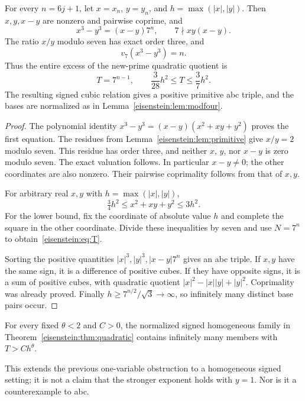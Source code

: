 \begin{theorem}\label{eisenstein:thm:quadratic}
For every $n=6j+1$, let $x=x_n$, $y=y_n$, and $h=\max(|x|,|y|)$. Then $x,y,x-y$ are nonzero and pairwise coprime, and
\begin{equation}\label{eisenstein:eq:cubic}
x^3-y^3=(x-y)7^n,\qquad 7\nmid xy(x-y).
\end{equation}
The ratio $x/y$ modulo seven has exact order three, and
\[
v_7(x^3-y^3)=n.
\]
Thus the entire excess of the new-prime quadratic quotient is
\begin{equation}\label{eisenstein:eq:T}
T=7^{n-1},\qquad \frac{3}{28}h^2\le T\le\frac37h^2.
\end{equation}
The resulting signed cubic relation gives a positive primitive abc triple, and the bases are normalized as in Lemma~\ref{eisenstein:lem:modfour}.
\end{theorem}
\begin{proof}
The polynomial identity $x^3-y^3=(x-y)(x^2+xy+y^2)$ proves the first equation. The residues from Lemma~\ref{eisenstein:lem:primitive} give $x/y=2$ modulo seven. This residue has order three, and neither $x$, $y$, nor $x-y$ is zero modulo seven. The exact valuation follows. In particular $x-y\ne0$; the other coordinates are also nonzero. Their pairwise coprimality follows from that of $x,y$.

For arbitrary real $x,y$ with $h=\max(|x|,|y|)$,
\[
\tfrac34 h^2\le x^2+xy+y^2\le3h^2.
\]
For the lower bound, fix the coordinate of absolute value $h$ and complete the square in the other coordinate. Divide these inequalities by seven and use $N=7^n$ to obtain~\eqref{eisenstein:eq:T}.

Sorting the positive quantities $|x|^3,|y|^3,|x-y|7^n$ gives an abc triple. If $x,y$ have the same sign, it is a difference of positive cubes. If they have opposite signs, it is a sum of positive cubes, with quadratic quotient $|x|^2-|x||y|+|y|^2$. Coprimality was already proved. Finally $h\ge7^{n/2}/\sqrt3\to\infty$, so infinitely many distinct base pairs occur.
\end{proof}

\begin{corollary}
For every fixed $\theta<2$ and $C>0$, the normalized signed homogeneous family in Theorem~\ref{eisenstein:thm:quadratic} contains infinitely many members with $T>Ch^\theta$.
\end{corollary}
This extends the previous one-variable obstruction to a homogeneous signed setting; it is not a claim that the stronger exponent holds with $y=1$. Nor is it a counterexample to abc.

